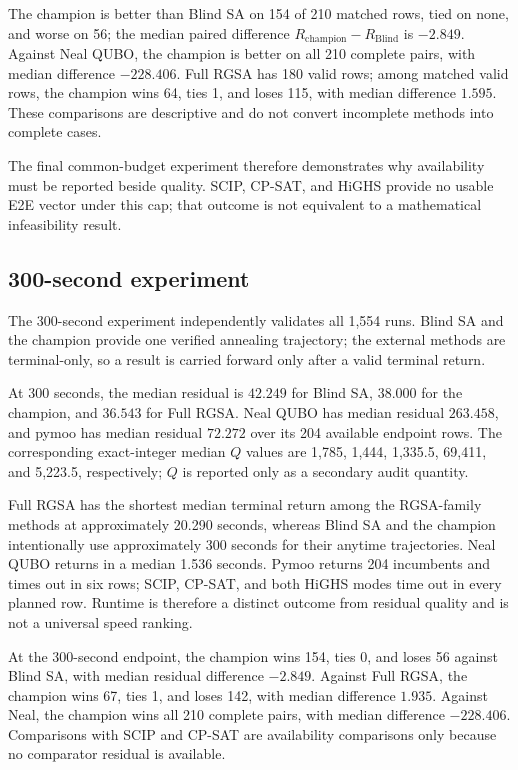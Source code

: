\documentclass[11pt]{article}
\begin{document}
The champion is better than Blind SA on 154 of 210 matched rows, tied on none, and worse on 56; the median paired difference $R_{\mathrm{champion}}-R_{\mathrm{Blind}}$ is $-2.849$. Against Neal QUBO, the champion is better on all 210 complete pairs, with median difference $-228.406$. Full RGSA has 180 valid rows; among matched valid rows, the champion wins 64, ties 1, and loses 115, with median difference $1.595$. These comparisons are descriptive and do not convert incomplete methods into complete cases.

The final common-budget experiment therefore demonstrates why availability must be reported beside quality. SCIP, CP-SAT, and HiGHS provide no usable E2E vector under this cap; that outcome is not equivalent to a mathematical infeasibility result.

\subsection{300-second experiment}
The 300-second experiment independently validates all 1,554 runs. Blind SA and the champion provide one verified annealing trajectory; the external methods are terminal-only, so a result is carried forward only after a valid terminal return.

At 300 seconds, the median residual is $42.249$ for Blind SA, $38.000$ for the champion, and $36.543$ for Full RGSA. Neal QUBO has median residual $263.458$, and pymoo has median residual $72.272$ over its 204 available endpoint rows. The corresponding exact-integer median $Q$ values are 1,785, 1,444, 1,335.5, 69,411, and 5,223.5, respectively; $Q$ is reported only as a secondary audit quantity.

Full RGSA has the shortest median terminal return among the RGSA-family methods at approximately 20.290 seconds, whereas Blind SA and the champion intentionally use approximately 300 seconds for their anytime trajectories. Neal QUBO returns in a median 1.536 seconds. Pymoo returns 204 incumbents and times out in six rows; SCIP, CP-SAT, and both HiGHS modes time out in every planned row. Runtime is therefore a distinct outcome from residual quality and is not a universal speed ranking.

At the 300-second endpoint, the champion wins 154, ties 0, and loses 56 against Blind SA, with median residual difference $-2.849$. Against Full RGSA, the champion wins 67, ties 1, and loses 142, with median difference $1.935$. Against Neal, the champion wins all 210 complete pairs, with median difference $-228.406$. Comparisons with SCIP and CP-SAT are availability comparisons only because no comparator residual is available.
\end{document}

